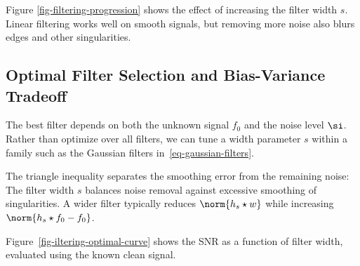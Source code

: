      
          
                                          
                                           
   
                                                                    
                  
          
                                        
                                           
   
                                                                  
                  
    

Figure \ref{fig-filtering-progression} shows the effect of increasing the filter width $s$. Linear filtering works well on smooth signals, but removing more noise also blurs edges and other singularities.


                                                     
\subsection{Optimal Filter Selection and Bias-Variance Tradeoff}
\label{subsec-optimal-selection-filter}

The best filter depends on both the unknown signal $f_0$ and the noise level $\si$. Rather than optimize over all filters, we can tune a width parameter $s$ within a family such as the Gaussian filters in~\eqref{eq-gaussian-filters}.

The triangle inequality separates the smoothing error from the remaining noise:
The filter width $s$ balances noise removal against excessive smoothing of singularities. A wider filter typically reduces $\norm{h_s \star w}$ while increasing $\norm{h_s\star f_0-f_0}$.

Figure~\ref{fig-iltering-optimal-curve} shows the SNR as a function of filter width, evaluated using the known clean signal.


